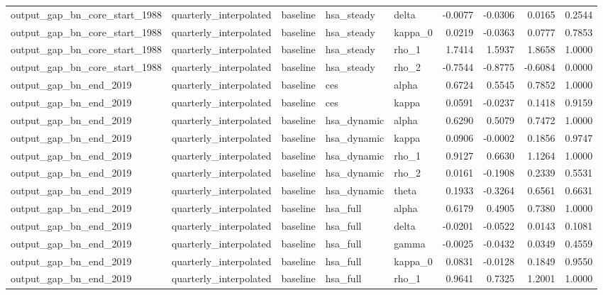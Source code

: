 \begin{tabular}{lllllrrrr}
output\_gap\_bn\_core\_start\_1988 & quarterly\_interpolated & baseline & hsa\_steady & delta & -0.0077 & -0.0306 & 0.0165 & 0.2544 \\
output\_gap\_bn\_core\_start\_1988 & quarterly\_interpolated & baseline & hsa\_steady & kappa\_0 & 0.0219 & -0.0363 & 0.0777 & 0.7853 \\
output\_gap\_bn\_core\_start\_1988 & quarterly\_interpolated & baseline & hsa\_steady & rho\_1 & 1.7414 & 1.5937 & 1.8658 & 1.0000 \\
output\_gap\_bn\_core\_start\_1988 & quarterly\_interpolated & baseline & hsa\_steady & rho\_2 & -0.7544 & -0.8775 & -0.6084 & 0.0000 \\
output\_gap\_bn\_end\_2019 & quarterly\_interpolated & baseline & ces & alpha & 0.6724 & 0.5545 & 0.7852 & 1.0000 \\
output\_gap\_bn\_end\_2019 & quarterly\_interpolated & baseline & ces & kappa & 0.0591 & -0.0237 & 0.1418 & 0.9159 \\
output\_gap\_bn\_end\_2019 & quarterly\_interpolated & baseline & hsa\_dynamic & alpha & 0.6290 & 0.5079 & 0.7472 & 1.0000 \\
output\_gap\_bn\_end\_2019 & quarterly\_interpolated & baseline & hsa\_dynamic & kappa & 0.0906 & -0.0002 & 0.1856 & 0.9747 \\
output\_gap\_bn\_end\_2019 & quarterly\_interpolated & baseline & hsa\_dynamic & rho\_1 & 0.9127 & 0.6630 & 1.1264 & 1.0000 \\
output\_gap\_bn\_end\_2019 & quarterly\_interpolated & baseline & hsa\_dynamic & rho\_2 & 0.0161 & -0.1908 & 0.2339 & 0.5531 \\
output\_gap\_bn\_end\_2019 & quarterly\_interpolated & baseline & hsa\_dynamic & theta & 0.1933 & -0.3264 & 0.6561 & 0.6631 \\
output\_gap\_bn\_end\_2019 & quarterly\_interpolated & baseline & hsa\_full & alpha & 0.6179 & 0.4905 & 0.7380 & 1.0000 \\
output\_gap\_bn\_end\_2019 & quarterly\_interpolated & baseline & hsa\_full & delta & -0.0201 & -0.0522 & 0.0143 & 0.1081 \\
output\_gap\_bn\_end\_2019 & quarterly\_interpolated & baseline & hsa\_full & gamma & -0.0025 & -0.0432 & 0.0349 & 0.4559 \\
output\_gap\_bn\_end\_2019 & quarterly\_interpolated & baseline & hsa\_full & kappa\_0 & 0.0831 & -0.0128 & 0.1849 & 0.9550 \\
output\_gap\_bn\_end\_2019 & quarterly\_interpolated & baseline & hsa\_full & rho\_1 & 0.9641 & 0.7325 & 1.2001 & 1.0000 \\

\end{tabular}
